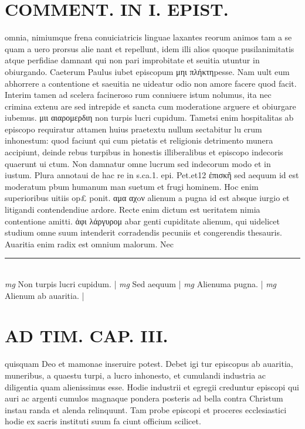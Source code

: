 \documentclass{article}
\begin{document}
\begin{pages}
\section*{COMMENT. IN I. EPIST. }\pstart omnia, nimiumque frena conuiciatricis linguae laxantes reorum animos tam a se quam a uero prorsus alie nant et repellunt, idem illi alios quoque pusilanimitatis atque perfidiae damnant qui non pari improbitate et seuitia utuntur in obiurgando. Caeterum Paulus iubet episcopum μηι πλήκτηpesse. Nam uult eum abhorrere a contentione et saeuitia ne uideatur odio non amore facere quod facit. Interim tamen ad scelera facineroso rum conniuere istum nolumus, ita nec crimina extenu are sed intrepide et sancta cum moderatione arguere et obiurgare iubemus. μιι αιαρομερδιη non turpis lucri cupidum. Tametsi enim hospitalitas ab episcopo requiratur attamen huius praetextu nullum sectabitur lu crum inhonestum: quod faciunt qui cum pietatis et religionis detrimento munera accipiunt, deinde rebus turpibus in honestis illiberalibus et episcopo indecoris quaerunt ui ctum. Non damnatur omne lucrum sed indecorum modo et in iustum. Plura annotaui de hac re in s.ca.1. epi. Pet.et12 ἐπισκῆ sed aequum id est moderatum pbum humanum man suetum et frugi hominem. Hoc enim superioribus uitiis op£ ponit. αμα αχoν alienum a pugna id est absque iurgio et litigandi contendendiue ardore. Recte enim dictum est ueritatem nimia contentione amitti. ἀφι λάργυρομ abar genti cupiditate alienum, qui uidelicet studium omne suum intenderit corradendis pecuniis et congerendis thesauris. Auaritia enim radix est omnium malorum. Nec  \pend
\vspace{0.5cm}\noindent
\vspace{0.2cm}\rule{1cm}{0.2pt}\\ 
\hspace{0.2cm}\textit{mg}
\footnotesize Non turpis lucri cupidum. 
\normalsize| 
\hspace{0.2cm}\textit{mg}
\footnotesize Sed aequum 
\normalsize| 
\hspace{0.2cm}\textit{mg}
\footnotesize Alienuma pugna. 
\normalsize| 
\hspace{0.2cm}\textit{mg}
\footnotesize Alienum ab auaritia. 
\normalsize| 
\section*{AD TIM. CAP. III. }
\marginpar{[ p.128 ]}\pstart quisquam Deo et mamonae inseruire potest. Debet igi tur episcopus ab auaritia, muneribus, a quaestu turpi, a lucro inhonesto, et cumulandi industria ac diligentia quam alienissimus esse. Hodie industrii et egregii creduntur episcopi qui auri ac argenti cumulos magnaque pondera posteris ad bella contra Christum instau randa et alenda relinquunt. Tam probe episcopi et proceres ecclesiastici hodie ex sacris instituti suum fa ciunt officium scilicet.  \pend
{}
{}

\end{pages}
\end{document}
